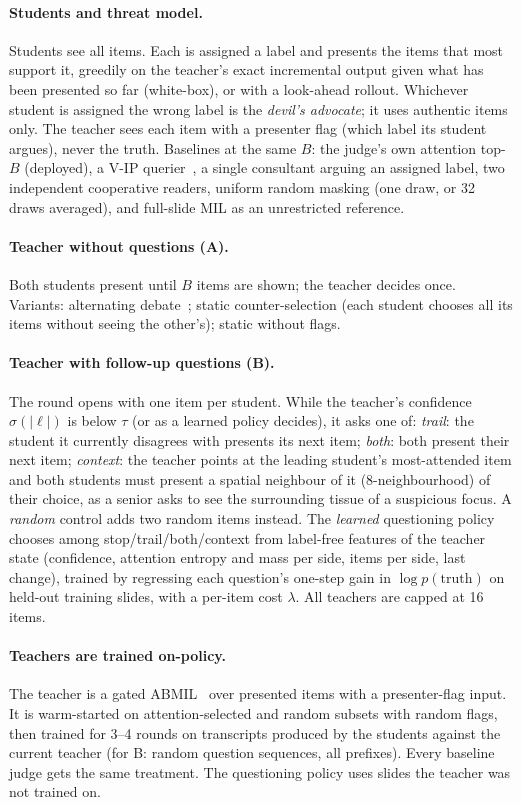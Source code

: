 \documentclass[10pt,twocolumn,letterpaper]{article}
\begin{document}
\paragraph{Students and threat model.} Students see all items. Each is assigned a label and presents the items that most support it, greedily on the teacher's exact incremental output given what has been presented so far (white-box), or with a look-ahead rollout. Whichever student is assigned the wrong label is the \emph{devil's advocate}; it uses authentic items only. The teacher sees each item with a presenter flag (which label its student argues), never the truth. Baselines at the same $B$: the judge's own attention top-$B$ (deployed), a V-IP querier~\cite{chattopadhyay2023vip}, a single consultant arguing an assigned label, two independent cooperative readers, uniform random masking (one draw, or 32 draws averaged), and full-slide MIL as an unrestricted reference.
\paragraph{Teacher without questions (A).} Both students present until $B$ items are shown; the teacher decides once. Variants: alternating debate~\cite{irving2018debate}; static counter-selection (each student chooses all its items without seeing the other's); static without flags.
\paragraph{Teacher with follow-up questions (B).} The round opens with one item per student. While the teacher's confidence $\sigma(|\ell|)$ is below $\tau$ (or as a learned policy decides), it asks one of: \emph{trail}: the student it currently disagrees with presents its next item; \emph{both}: both present their next item; \emph{context}: the teacher points at the leading student's most-attended item and both students must present a spatial neighbour of it (8-neighbourhood) of their choice, as a senior asks to see the surrounding tissue of a suspicious focus. A \emph{random} control adds two random items instead. The \emph{learned} questioning policy chooses among stop/trail/both/context from label-free features of the teacher state (confidence, attention entropy and mass per side, items per side, last change), trained by regressing each question's one-step gain in $\log p(\text{truth})$ on held-out training slides, with a per-item cost $\lambda$. All teachers are capped at 16 items.
\paragraph{Teachers are trained on-policy.} The teacher is a gated ABMIL~\cite{ilse2018abmil} over presented items with a presenter-flag input. It is warm-started on attention-selected and random subsets with random flags, then trained for 3--4 rounds on transcripts produced by the students against the current teacher (for B: random question sequences, all prefixes). Every baseline judge gets the same treatment. The questioning policy uses slides the teacher was not trained on.
\end{document}
